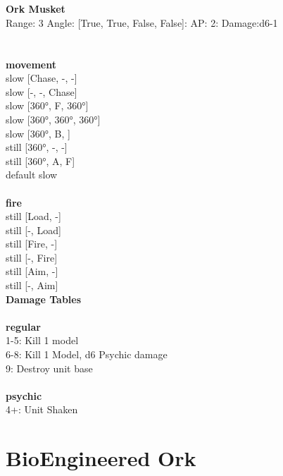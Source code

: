 \ \\

\ \\
{\bf Ork Musket } \\



Range: 3  Angle: [True, True, False, False]: AP: 2: Damage:d6-1 \\




 
\ \\




\ \\ {\bf movement } \\
slow [Chase, -, -] \\
slow [-, -, Chase] \\
slow [360°, F, 360°] \\
slow [360°, 360°, 360°] \\
slow [360°, B, ] \\
still [360°, -, -] \\
still [360°, A, F] \\
default slow \\
\ \\ {\bf fire } \\
still [Load, -] \\
still [-, Load] \\
still [Fire, -] \\
still [-, Fire] \\
still [Aim, -] \\
still [-, Aim] \\


{\bf Damage Tables} \\
\ \\ {\bf regular } \\
1-5: Kill 1 model \\
6-8: Kill 1 Model, d6 Psychic damage \\
9: Destroy unit base \\
\ \\ {\bf psychic } \\
4+: Unit Shaken \\










\pagebreak\pagebreak

\section{ BioEngineered Ork }

